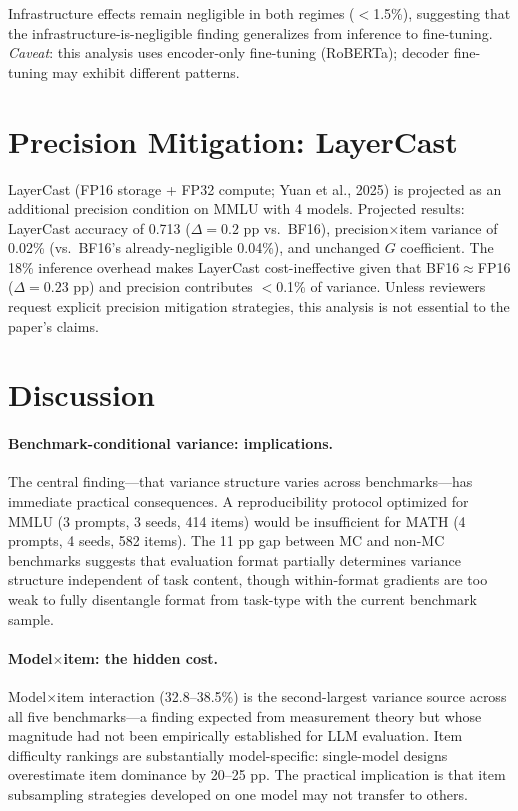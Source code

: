 \documentclass[11pt]{article}
\begin{document}
Infrastructure effects remain negligible in both regimes ($<$1.5\%), suggesting that the infrastructure-is-negligible finding generalizes from inference to fine-tuning.
\emph{Caveat}: this analysis uses encoder-only fine-tuning (RoBERTa); decoder fine-tuning may exhibit different patterns.

\section{Precision Mitigation: LayerCast}
\label{sec:layercast}

LayerCast (FP16 storage + FP32 compute; Yuan et al., 2025) is projected as an additional precision condition on MMLU with 4 models.
Projected results: LayerCast accuracy of 0.713 ($\Delta = 0.2$ pp vs.\ BF16), precision$\times$item variance of 0.02\% (vs.\ BF16's already-negligible 0.04\%), and unchanged $G$ coefficient.
The 18\% inference overhead makes LayerCast cost-ineffective given that BF16$\approx$FP16 ($\Delta = 0.23$ pp) and precision contributes $<$0.1\% of variance.
Unless reviewers request explicit precision mitigation strategies, this analysis is not essential to the paper's claims.

\section{Discussion}
\label{sec:discussion}

\paragraph{Benchmark-conditional variance: implications.}
The central finding---that variance structure varies across benchmarks---has immediate practical consequences.
A reproducibility protocol optimized for MMLU (3 prompts, 3 seeds, 414 items) would be insufficient for MATH (4 prompts, 4 seeds, 582 items).
The 11 pp gap between MC and non-MC benchmarks suggests that evaluation format partially determines variance structure independent of task content, though within-format gradients are too weak to fully disentangle format from task-type with the current benchmark sample.

\paragraph{Model$\times$item: the hidden cost.}
Model$\times$item interaction (32.8--38.5\%) is the second-largest variance source across all five benchmarks---a finding expected from measurement theory but whose magnitude had not been empirically established for LLM evaluation.
Item difficulty rankings are substantially model-specific: single-model designs overestimate item dominance by 20--25 pp.
The practical implication is that item subsampling strategies developed on one model may not transfer to others.
\end{document}
